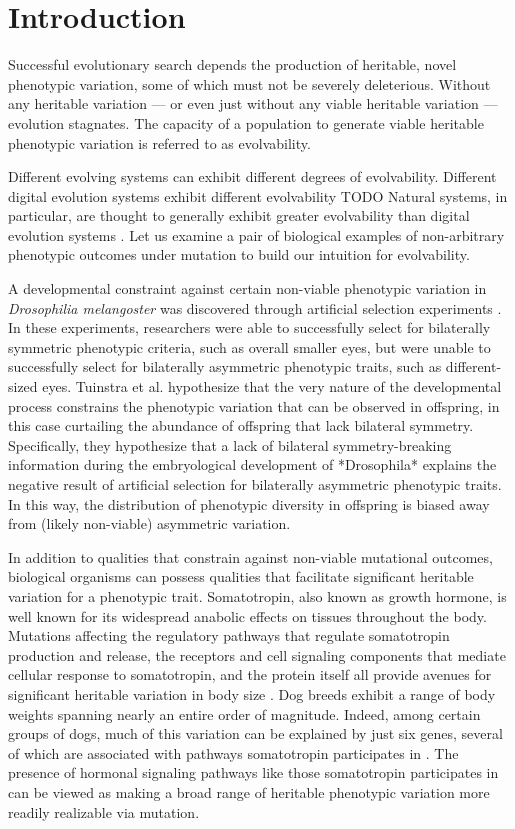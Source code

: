 \section{Introduction} \label{sec:background}

Successful evolutionary search depends the production of heritable, novel phenotypic variation, some of which must not be severely deleterious.
Without any heritable variation --- or even just without any viable heritable variation --- evolution stagnates.
The capacity of a population to generate viable heritable phenotypic variation is referred to as evolvability.

Different evolving systems can exhibit different degrees of evolvability.
Different digital evolution systems exhibit different evolvability TODO
Natural systems, in particular, are thought to generally exhibit greater evolvability than digital evolution systems \cite{mengistu2016evolvability}.
Let us examine a pair of biological examples of non-arbitrary phenotypic outcomes under mutation to build our intuition for evolvability.

A developmental constraint against certain non-viable phenotypic variation in  \textit{Drosophilia melangoster} was discovered through artificial selection experiments \cite{coyne1987lack, tuinstra1990lack}.
In these experiments,  researchers were able to successfully select for bilaterally symmetric phenotypic criteria, such as overall smaller eyes, but were unable to successfully select for bilaterally asymmetric phenotypic traits, such as different-sized eyes.
Tuinstra et al. hypothesize that the very nature of the developmental process constrains the phenotypic variation that can be observed in offspring, in this case curtailing the abundance of offspring that lack bilateral symmetry.
Specifically, they hypothesize that a lack of bilateral symmetry-breaking information during the embryological development of *Drosophila* explains the negative result of artificial selection for bilaterally asymmetric phenotypic traits.
In this way, the distribution of phenotypic diversity in offspring is biased away from (likely non-viable) asymmetric variation.

In addition to qualities that constrain against non-viable mutational outcomes, biological organisms can possess qualities that facilitate significant heritable variation for a phenotypic trait.
Somatotropin, also known as growth hormone, is well known for its widespread anabolic effects on tissues throughout the body.
Mutations affecting the regulatory pathways that regulate somatotropin production and release, the receptors and cell signaling components that mediate cellular response to somatotropin, and the protein itself all provide avenues for significant heritable variation in body size \cite{devesa2016multiple}.
Dog breeds exhibit a range of body weights spanning nearly an entire order of magnitude.
Indeed, among certain groups of dogs, much of this variation can be explained by just six genes, several of which are associated with pathways somatotropin participates in \cite{rimbault2013derived}.
The presence of hormonal signaling pathways like those somatotropin participates in can be viewed as making a broad range of heritable phenotypic variation more readily realizable via mutation.

